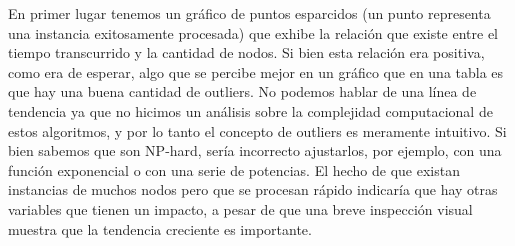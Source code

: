 En primer lugar tenemos un gráfico de puntos esparcidos (un punto representa una instancia exitosamente procesada) que exhibe la relación que existe entre el tiempo transcurrido y la cantidad de nodos. Si bien esta relación era positiva, como era de esperar, algo que se percibe mejor en un gráfico que en una tabla es que hay una buena cantidad de outliers. No podemos hablar de una línea de tendencia ya que no hicimos un análisis sobre la complejidad computacional de estos algoritmos, y por lo tanto el concepto de outliers es meramente intuitivo. Si bien sabemos que son NP-hard, sería incorrecto ajustarlos, por ejemplo, con una función exponencial o con una serie de potencias. El hecho de que existan instancias de muchos nodos pero que se procesan rápido indicaría que hay otras variables que tienen un impacto, a pesar de que una breve inspección visual muestra que la tendencia creciente es importante.    

